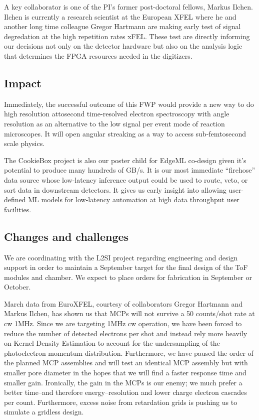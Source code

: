\documentclass[aps]{revtex4}
\begin{document}
A key collaborator is one of the PI's former post-doctoral fellows, Markus Ilchen.  
Ilchen is currently a research scientist at the European XFEL where he and another long time colleague Gregor Hartmann are making early test of signal degredation at the high repetition rates xFEL.
These test are directly informing our decisions not only on the detector hardware but also on the analysis logic that determines the FPGA resources needed in the digitizers.


\subsection*{Impact}
Immediately, the successful outcome of this FWP would provide a new way to do high resolution attosecond time-resolved electron spectroscopy with angle resolution as an alternative to the low signal per event mode of reaction microscopes.  
It will open angular streaking as a way to access sub-femtosecond scale physics.

The CookieBox project is also our poster child for EdgeML co-design given it's potential to produce many hundreds of GB/s.
It is our most immediate ``firehose'' data source whose low-latency inference output could be used to route, veto, or sort data in downstream detectors.
It gives us early insight into allowing user-defined ML models for low-latency automation at high data throughput user facilities.  


\subsection*{Changes and challenges}
We are coordinating with the L2SI project regarding engineering and design support in order to maintain a September target for the final design of the ToF modules and chamber.
We expect to place orders for fabrication in September or October.

March data from EuroXFEL, courtesy of collaborators Gregor Hartmann and Markus Ilchen, has shown us that MCPs will not survive a 50 counts/shot rate at cw 1MHz.
Since we are targeting 1MHz cw operation, we have been forced to reduce the number of detected electrons per shot and instead rely more heavily on Kernel Density Estimation to account for the undersampling of the photoelectron momentum distribution.
Furthermore, we have paused the order of the planned MCP assemblies and will test an identical MCP assembly but with smaller pore diameter in the hopes that we will find a faster response time and smaller gain.
Ironically, the gain in the MCPs is our enemy; we much prefer a better time--and therefore energy--resolution and lower charge electron cascades per count.
Furthermore, excess noise from retardation grids is pushing us to simulate a gridless design.
\end{document}
